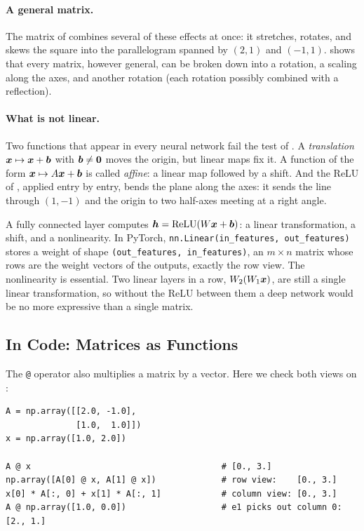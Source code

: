 \paragraph{A general matrix.}
The matrix of  combines several of these effects at
once: it stretches, rotates, and skews the square into the parallelogram
spanned by $(2, 1)$ and $(-1, 1)$.  shows that every
matrix, however general, can be broken down into a rotation, a scaling
along the axes, and another rotation (each rotation possibly combined
with a reflection).

\paragraph{What is not linear.}
Two functions that appear in every neural network fail the test of
. A \emph{translation}
$\bm{x} \mapsto \bm{x} + \bm{b}$ with $\bm{b} \ne \bm{0}$
moves the origin, but linear maps fix it. A function of the form
$\bm{x} \mapsto A\bm{x} + \bm{b}$ is called \emph{affine}: a linear
map followed by a shift. And the ReLU of , applied entry
by entry, bends the plane along the axes: it sends the line through
$(1, -1)$ and the origin to two half-axes meeting at a right angle.

\begin{aibox}
  A fully connected layer computes $\bm{h} = \operatorname{ReLU}(W\bm{x}
  + \bm{b})$: a linear transformation, a shift, and a nonlinearity. In
  PyTorch, \texttt{nn.Linear(in\_features, out\_features)} stores a weight
  of shape \texttt{(out\_features, in\_features)}, an $m \times n$ matrix
  whose rows are the weight vectors of the outputs, exactly the row view.
  The nonlinearity is essential. Two linear layers in a row,
  $W_2(W_1\bm{x})$, are still a single linear transformation, so without
  the ReLU between them a deep network would be no more expressive than a
  single matrix.
\end{aibox}

\subsection{In Code: Matrices as Functions}
\label{sec:ch03-matvec-code}

The \texttt{@} operator also multiplies a matrix by a vector. Here we check
both views on :

\begin{lstlisting}
A = np.array([[2.0, -1.0],
              [1.0,  1.0]])
x = np.array([1.0, 2.0])

A @ x                                      # [0., 3.]
np.array([A[0] @ x, A[1] @ x])             # row view:    [0., 3.]
x[0] * A[:, 0] + x[1] * A[:, 1]            # column view: [0., 3.]
A @ np.array([1.0, 0.0])                   # e1 picks out column 0: [2., 1.]
\end{lstlisting}

